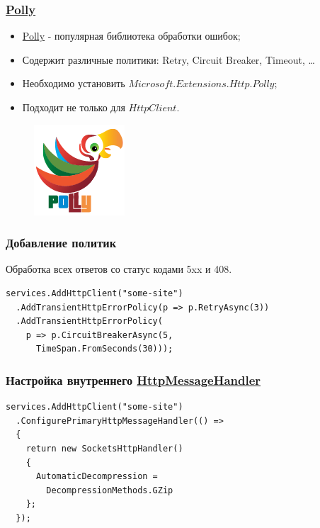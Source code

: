 \documentclass{beamer}
\begin{document}
\begin{frame}
\frametitle{\href{https://github.com/App-vNext/Polly}{Polly}}
\begin{itemize}
\item \href{https://github.com/App-vNext/Polly}{Polly} - популярная библиотека обработки ошибок;
\item Содержит различные политики: Retry, Circuit Breaker, Timeout, \ldots
\item Необходимо установить \href{https://www.nuget.org/packages/Microsoft.Extensions.Http.Polly/}{$Microsoft.Extensions.Http.Polly$};
\item Подходит не только для $HttpClient$.
\end{itemize}
\begin{figure}
\includegraphics[scale=0.4]{polly}
\end{figure}
\end{frame}

\begin{frame}[fragile]
\frametitle{Добавление политик}
Обработка всех ответов со статус кодами 5xx и 408.
\newline
\begin{lstlisting}
services.AddHttpClient("some-site")
  .AddTransientHttpErrorPolicy(p => p.RetryAsync(3))
  .AddTransientHttpErrorPolicy(
    p => p.CircuitBreakerAsync(5, 
      TimeSpan.FromSeconds(30)));
\end{lstlisting}
\end{frame}

\begin{frame}[fragile]
\frametitle{Настройка внутреннего \href{https://docs.microsoft.com/en-us/dotnet/api/system.net.http.socketshttphandler?view=netcore-2.2}{HttpMessageHandler}}
\begin{lstlisting}
services.AddHttpClient("some-site")
  .ConfigurePrimaryHttpMessageHandler(() =>
  {
    return new SocketsHttpHandler()
    {
      AutomaticDecompression = 
        DecompressionMethods.GZip
    };
  });
\end{lstlisting}
\end{frame}
\end{document}
